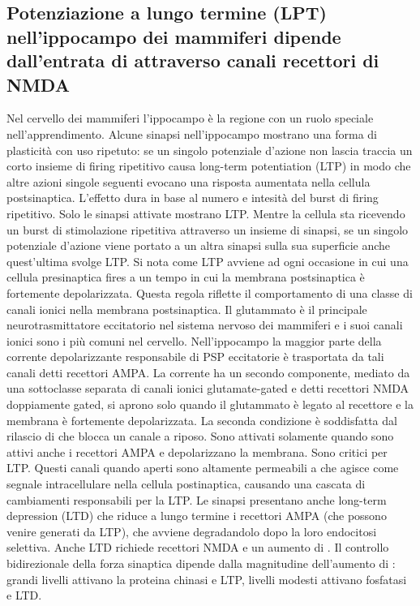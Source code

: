 \subsection{Potenziazione a lungo termine (LPT) nell'ippocampo dei mammiferi dipende dall'entrata di  attraverso canali recettori di NMDA}
Nel cervello dei mammiferi l'ippocampo \`e la regione con un ruolo speciale nell'apprendimento. Alcune sinapsi nell'ippocampo mostrano una forma di plasticit\`a con uso ripetuto: se
un singolo potenziale d'azione non lascia traccia un corto insieme di firing ripetitivo causa long-term potentiation (LTP) in modo che altre azioni singole seguenti evocano una
risposta aumentata nella cellula postsinaptica. L'effetto dura in base al numero e intesit\`a del burst di firing ripetitivo. Solo le sinapsi attivate mostrano LTP. Mentre la cellula
sta ricevendo un burst di stimolazione ripetitiva attraverso un insieme di sinapsi, se un singolo potenziale d'azione viene portato a un altra sinapsi sulla sua superficie anche 
quest'ultima svolge LTP. Si nota come LTP avviene ad ogni occasione in cui una cellula presinaptica fires a un tempo in cui la membrana postsinaptica \`e fortemente depolarizzata. 
Questa regola riflette il comportamento di una classe di canali ionici nella membrana postsinaptica. Il glutammato \`e il principale neurotrasmittatore eccitatorio nel sistema nervoso
dei mammiferi e i suoi canali ionici sono i pi\`u comuni nel cervello. Nell'ippocampo la maggior parte della corrente depolarizzante responsabile di PSP eccitatorie \`e trasportata
da tali canali detti recettori AMPA. La corrente ha un secondo componente, mediato da una sottoclasse separata di canali ionici glutamate-gated e detti recettori NMDA doppiamente gated,
si aprono solo quando il glutammato \`e legato al recettore e la membrana \`e fortemente depolarizzata. La seconda condizione \`e soddisfatta dal rilascio di  che blocca 
un canale a riposo. Sono attivati solamente quando sono attivi anche i recettori AMPA e depolarizzano la membrana. Sono critici per LTP. Questi canali quando aperti sono
altamente permeabili a  che agisce come segnale intracellulare nella cellula postinaptica, causando una cascata di cambiamenti responsabili per la LTP. Le sinapsi presentano
anche long-term depression (LTD) che riduce a lungo termine i recettori AMPA (che possono venire generati da LTP), che avviene degradandolo dopo la loro endocitosi selettiva. 
Anche LTD richiede recettori NMDA e un aumento di . Il controllo bidirezionale della forza sinaptica dipende dalla magnitudine dell'aumento di : grandi livelli
attivano la proteina chinasi e LTP, livelli modesti attivano fosfatasi e LTD. 
